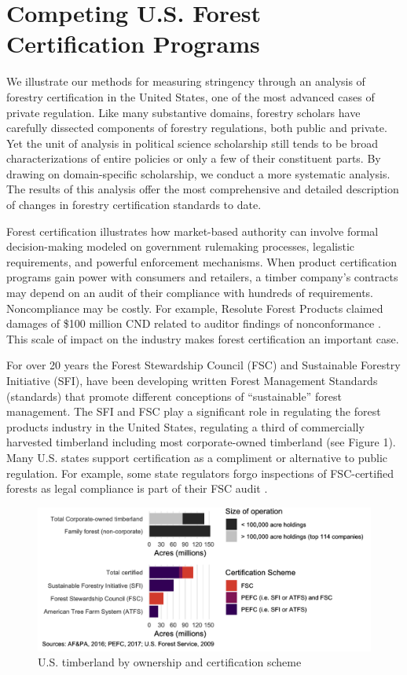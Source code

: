 \documentclass[
      12pt,
            Review ]{article}
\begin{document}
\hypertarget{competing-u.s.-forest-certification-programs}{%
\section{Competing U.S. Forest Certification Programs}\label{competing-u.s.-forest-certification-programs}}

We illustrate our methods for measuring stringency through an analysis of forestry certification in the United States, one of the most advanced cases of private regulation. Like many substantive domains, forestry scholars have carefully dissected components of forestry regulations, both public and private. Yet the unit of analysis in political science scholarship still tends to be broad characterizations of entire policies or only a few of their constituent parts. By drawing on domain-specific scholarship, we conduct a more systematic analysis. The results of this analysis offer the most comprehensive and detailed description of changes in forestry certification standards to date.

Forest certification illustrates how market-based authority can involve formal decision-making modeled on government rulemaking processes, legalistic requirements, and powerful enforcement mechanisms. When product certification programs gain power with consumers and retailers, a timber company's contracts may depend on an audit of their compliance with hundreds of requirements. Noncompliance may be costly. For example, Resolute Forest Products claimed damages of \$100 million CND related to auditor findings of nonconformance \citep{Tigar2017}. This scale of impact on the industry makes forest certification an important case.

For over 20 years the Forest Stewardship Council (FSC) and Sustainable Forestry Initiative (SFI), have been developing written Forest Management Standards (standards) that promote different conceptions of ``sustainable'' forest management. The SFI and FSC play a significant role in regulating the forest products industry in the United States, regulating a third of commercially harvested timberland including most corporate-owned timberland (see Figure 1). Many U.S. states support certification as a compliment or alternative to public regulation. For example, some state regulators forgo inspections of FSC-certified forests as legal compliance is part of their FSC audit \citep{Judge-Lord2013}.

\begin{figure}
\centering
\includegraphics{acres-1.png}
\caption{U.S. timberland by ownership and certification scheme}
\end{figure}
\end{document}
